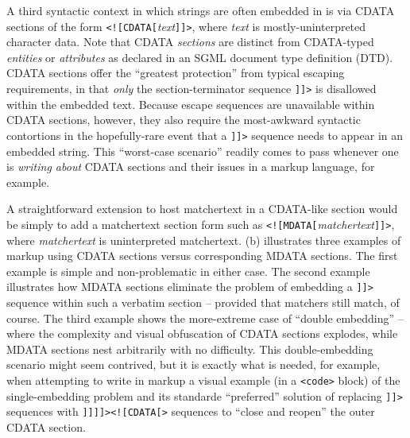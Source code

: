 A third syntactic context in which strings are often embedded in \ml
is via CDATA sections of the form \verb|<![CDATA[|\emph{text}\verb|]]>|,
where \emph{text} is mostly-uninterpreted character data.
Note that CDATA \emph{sections} are distinct from
CDATA-typed \emph{entities} or \emph{attributes}
as declared in an SGML document type definition (DTD).
CDATA sections offer the ``greatest protection''
from typical \ml escaping requirements,
in that \emph{only} the section-terminator sequence \verb|]]>|
is disallowed within the embedded text.
Because \ml escape sequences are unavailable within CDATA sections, however,
they also require the most-awkward syntactic contortions
in the hopefully-rare event that a \verb|]]>| sequence
needs to appear in an embedded string.
This ``worst-case scenario'' readily comes to pass
whenever one is \emph{writing about} CDATA sections and their issues
in a \ml markup language, for example.

A straightforward extension to host matchertext in a CDATA-like section
would be simply to add a matchertext section form
such as \verb|<![MDATA[|\emph{matchertext}\verb|]]>|,
where \emph{matchertext} is uninterpreted matchertext.
(b) illustrates three examples of markup
using CDATA sections versus corresponding MDATA sections.
The first example is simple and non-problematic in either case.
The second example illustrates how MDATA sections eliminate the problem
of embedding a \verb|]]>| sequence within such a verbatim section --
provided that matchers still match, of course.
The third example shows the more-extreme case of ``double embedding'' --
where the complexity and visual obfuscation of CDATA sections explodes,
while MDATA sections nest arbitrarily with no difficulty.
This double-embedding scenario might seem contrived,
but it is exactly what is needed, for example,
when attempting to write in \ml markup a visual example
(\eg in a \verb|<code>| block)
of the single-embedding problem and its standarde ``preferred'' solution
of replacing \verb|]]>| sequences with \verb|]]]]><![CDATA[>| sequences
to ``close and reopen'' the outer CDATA section.


